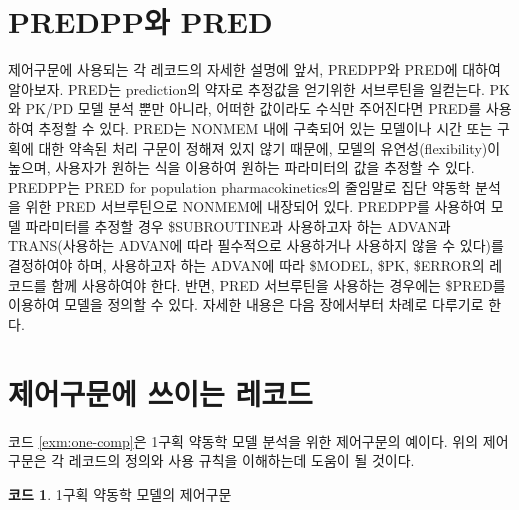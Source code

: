 \documentclass[
  11pt,
  krantz2, a4paper, twoside]{krantz}
\theoremstyle{definition}
\theoremstyle{definition}
\newtheorem{example}{코드}[chapter]
\theoremstyle{definition}
\theoremstyle{remark}
\begin{document}
\hypertarget{predppuxc640-pred}{%
\section{PREDPP와 PRED}\label{predppuxc640-pred}}


제어구문에 사용되는 각 레코드의 자세한 설명에 앞서, PREDPP와 PRED에 대하여 알아보자. PRED는 prediction의 약자로 추정값을 얻기위한 서브루틴을 일컫는다. PK와 PK/PD 모델 분석 뿐만 아니라, 어떠한 값이라도 수식만 주어진다면 PRED를 사용하여 추정할 수 있다.
PRED는 NONMEM 내에 구축되어 있는 모델이나 시간 또는 구획에 대한 약속된 처리 구문이 정해져 있지 않기 때문에, 모델의 유연성(flexibility)이 높으며, 사용자가 원하는 식을 이용하여 원하는 파라미터의 값을 추정할 수 있다.
PREDPP는 PRED for population pharmacokinetics의 줄임말로 집단 약동학 분석을 위한 PRED 서브루틴으로 NONMEM에 내장되어 있다. PREDPP를 사용하여 모델 파라미터를 추정할 경우 \$SUBROUTINE과 사용하고자 하는 ADVAN과 TRANS(사용하는 ADVAN에 따라 필수적으로 사용하거나 사용하지 않을 수 있다)를 결정하여야 하며, 사용하고자 하는 ADVAN에 따라 \$MODEL, \$PK, \$ERROR의 레코드를 함께 사용하여야 한다. 반면, PRED 서브루틴을 사용하는 경우에는 \$PRED를 이용하여 모델을 정의할 수 있다. 자세한 내용은 다음 장에서부터 차례로 다루기로 한다.

\hypertarget{control-record}{%
\section{제어구문에 쓰이는 레코드}\label{control-record}}

코드 \ref{exm:one-comp}은 1구획 약동학 모델 분석을 위한 제어구문의 예이다. 위의 제어구문은 각 레코드의 정의와 사용 규칙을 이해하는데 도움이 될 것이다.

\begin{example}
\protect\hypertarget{exm:one-comp}{}{\label{exm:one-comp} }1구획 약동학 모델의 제어구문
\end{example}
\vspace{-5ex}
\end{document}
